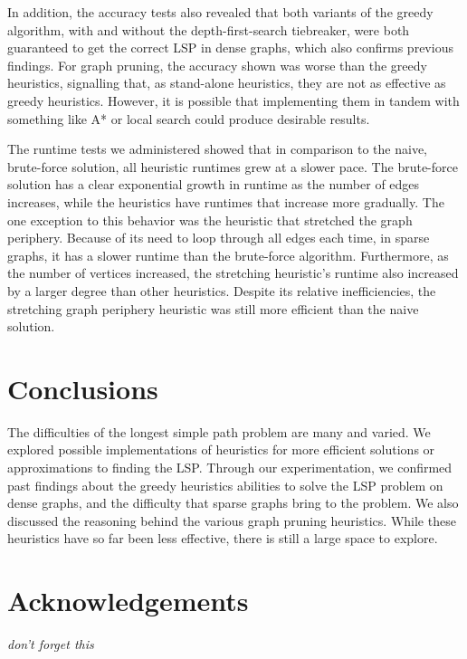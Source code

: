 \documentclass[twocolumn,showpacs,%
  nofootinbib,aps,superscriptaddress,%
  eqsecnum,prd,notitlepage,showkeys,11pt]{article}
\begin{document}
In addition, the accuracy tests also revealed that both variants of the greedy algorithm, with and without the depth-first-search tiebreaker, were both guaranteed to get the correct LSP in dense graphs, which also confirms previous findings. For graph pruning, the accuracy shown was worse than the greedy heuristics, signalling that, as stand-alone heuristics, they are not as effective as greedy heuristics. However, it is possible that implementing them in tandem with something like A* or local search could produce desirable results.

The runtime tests we administered showed that in comparison to the naive, brute-force solution, all heuristic runtimes grew at a slower pace. The brute-force solution has a clear exponential growth in runtime as the number of edges increases, while the heuristics have runtimes that increase more gradually. The one exception to this behavior was the heuristic that stretched the graph periphery. Because of its need to loop through all edges each time, in sparse graphs, it has a slower runtime than the brute-force algorithm. Furthermore, as the number of vertices increased, the stretching heuristic's runtime also increased by a larger degree than other heuristics. Despite its relative inefficiencies, the stretching graph periphery heuristic was still more efficient than the naive solution.


\section{Conclusions}

The difficulties of the longest simple path problem are many and varied.
We explored possible implementations of heuristics for more efficient solutions or approximations to finding the LSP. Through our experimentation, we confirmed past findings about the greedy heuristics abilities to solve the LSP problem on dense graphs, and the difficulty that sparse graphs bring to the problem. We also discussed the reasoning behind the various graph pruning heuristics. While these heuristics have so far been less effective, there is still a large space to explore.

\section*{Acknowledgements}

{\em don't forget this}



\end{document}
